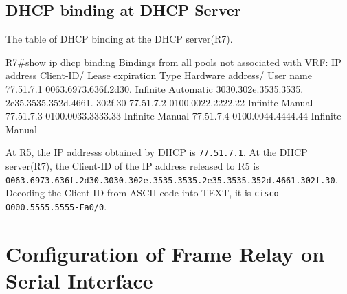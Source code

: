 \documentclass[10pt]{article}
\begin{document}
\subsection{DHCP binding at DHCP Server}
The table of DHCP binding at the DHCP server(R7).
\begin{verbatim*}
R7#show ip dhcp binding
Bindings from all pools not associated with VRF:
IP address          Client-ID/              Lease expiration        Type
                    Hardware address/
                    User name
77.51.7.1           0063.6973.636f.2d30.    Infinite                Automatic
                    3030.302e.3535.3535.
                    2e35.3535.352d.4661.
                    302f.30
77.51.7.2           0100.0022.2222.22       Infinite                Manual
77.51.7.3           0100.0033.3333.33       Infinite                Manual
77.51.7.4           0100.0044.4444.44       Infinite                Manual
\end{verbatim*}
At R5, the IP addresss obtained by DHCP is {\tt 77.51.7.1}. At the DHCP server(R7), the Client-ID of the IP address released to R5 is {\tt0063.6973.636f.2d30.3030.302e.3535.3535.2e35.3535.352d.4661.302f.30}. Decoding the Client-ID from ASCII code into TEXT, it is {\tt cisco-0000.5555.5555-Fa0/0}.
\section{Configuration of Frame Relay on Serial Interface}
\end{document}
